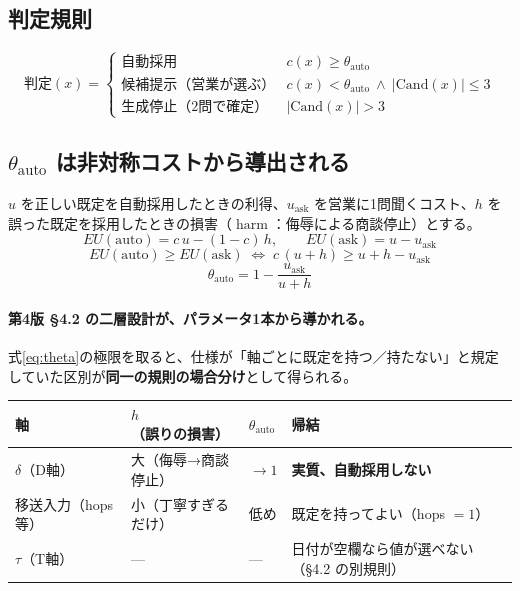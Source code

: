\documentclass[11pt,a4paper]{article}
\newcommand{\harm}{\operatorname{harm}}
\begin{document}
\subsection{判定規則}

\begin{equation}\label{eq:segrule}
\boxed{\;
\text{判定}(x) =
\begin{cases}
\text{自動採用} & c(x) \geq \theta_{\mathrm{auto}} \\[2pt]
\text{候補提示（営業が選ぶ）} & c(x) < \theta_{\mathrm{auto}} \ \wedge\ |\mathrm{Cand}(x)| \leq 3 \\[2pt]
\text{生成停止（2問で確定）} & |\mathrm{Cand}(x)| > 3
\end{cases}
\;}
\end{equation}

\subsection{$\theta_{\mathrm{auto}}$ は非対称コストから導出される}

$u$ を正しい既定を自動採用したときの利得、$u_{\mathrm{ask}}$ を営業に1問聞くコスト、$h$ を誤った既定を採用したときの損害（$\harm$：侮辱による商談停止）とする。
\[
EU(\text{auto}) = c\,u - (1-c)\,h, \qquad EU(\text{ask}) = u - u_{\mathrm{ask}}
\]
\[
EU(\text{auto}) \geq EU(\text{ask})
\;\Longleftrightarrow\; c\,(u+h) \geq u + h - u_{\mathrm{ask}}
\]
\begin{equation}\label{eq:theta}
\boxed{\;\theta_{\mathrm{auto}} = 1 - \frac{u_{\mathrm{ask}}}{u + h}\;}
\end{equation}

\paragraph{第4版 \S4.2 の二層設計が、パラメータ1本から導かれる。}
式\eqref{eq:theta}の極限を取ると、仕様が「軸ごとに既定を持つ／持たない」と規定していた区別が\textbf{同一の規則の場合分け}として得られる。

\begin{center}\small
\begin{tabular}{@{}llll@{}}
\toprule
軸 & $h$（誤りの損害） & $\theta_{\mathrm{auto}}$ & 帰結 \\
\midrule
$\delta$（D軸） & 大（侮辱→商談停止） & $\to 1$ & \textbf{実質、自動採用しない} \\
移送入力（hops 等） & 小（丁寧すぎるだけ） & 低め & 既定を持ってよい（hops $=1$） \\
$\tau$（T軸） & --- & --- & 日付が空欄なら値が選べない（\S4.2 の別規則） \\
\bottomrule
\end{tabular}
\end{center}
\end{document}
